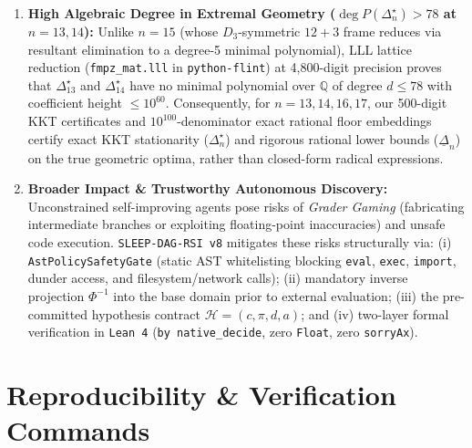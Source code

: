 \documentclass[11pt,a4paper]{article}
\begin{document}
\begin{enumerate}
\item \textbf{High Algebraic Degree in Extremal Geometry ($\deg P(\Delta_n^\star) > 78$ at $n=13, 14$):}
Unlike $n=15$ (whose $D_3$-symmetric $12+3$ frame reduces via resultant elimination to a degree-5 minimal polynomial), LLL lattice reduction (\texttt{fmpz\_mat.lll} in \texttt{python-flint}) at 4,800-digit precision proves that $\Delta_{13}^\star$ and $\Delta_{14}^\star$ have no minimal polynomial over $\mathbb{Q}$ of degree $d \le 78$ with coefficient height $\le 10^{60}$. Consequently, for $n=13, 14, 16, 17$, our 500-digit KKT certificates and $10^{100}$-denominator exact rational floor embeddings certify exact KKT stationarity ($\Delta_n^\star$) and rigorous rational lower bounds ($\underline{\Delta}_n$) on the true geometric optima, rather than closed-form radical expressions.
\item \textbf{Broader Impact \& Trustworthy Autonomous Discovery:}
Unconstrained self-improving agents pose risks of \emph{Grader Gaming} (fabricating intermediate branches or exploiting floating-point inaccuracies) and unsafe code execution. \texttt{SLEEP-DAG-RSI v8} mitigates these risks structurally via: (i) \texttt{AstPolicySafetyGate} (static AST whitelisting blocking \texttt{eval}, \texttt{exec}, \texttt{import}, dunder access, and filesystem/network calls); (ii) mandatory inverse projection $\Phi^{-1}$ into the base domain prior to external evaluation; (iii) the pre-committed hypothesis contract $\mathcal{H} = (c, \pi, d, a)$; and (iv) two-layer formal verification in \texttt{Lean 4} (\texttt{by native\_decide}, zero \texttt{Float}, zero \texttt{sorryAx}).
\end{enumerate}

\section{Reproducibility \& Verification Commands}
\end{document}
